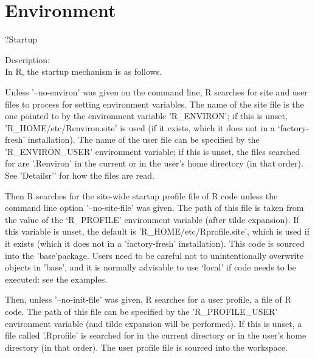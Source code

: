 \documentclass{beamer}
\begin{document}
\section{Environment}

\begin{frame}{?Startup}
\begin{tiny}
Description:\\
\bigskip
In R, the startup mechanism is as follows.\\
\bigskip

Unless '--no-environ' was given on the command line, R searches
 for site and user files to process for setting environment
 variables.  The name of the site file is the one pointed to by the
  environment variable 'R\_ENVIRON'; if this is unset,
 {\color{red} 'R\_HOME/etc/Renviron.site' is used (if it exists, which it 
 does not in a `factory-fresh' installation)}.  The name of the user file
 can be specified by the 'R\_ENVIRON\_USER' environment variable; if
 this is unset, the files searched for are {\color{blue} '.Renviron' 
 in the	current or in the user's home directory (in that order)}.  See
 'Detailsr'’ for how the files are read.\\
\bigskip

Then R searches for the site-wide startup profile file of R code
 unless the command line option '--no-site-file' was given.  The
 path of this file is taken from the value of the `R\_PROFILE'
 environment variable (after tilde expansion).  If this variable is
 unset, {\color{blue} the default is 'R\_HOME/etc/Rprofile.site', 
 which is used if it exists (which it does not in a 'factory-fresh' 
 installation)}. This code is sourced into the 'base'package.  
 Users need to be careful not to unintentionally overwrite objects 
 in 'base', and it is normally advisable to use ‘local’ if code 
 needs to be executed: see the examples.\\
\bigskip

Then, unless '--no-init-file' was given, R searches for a user
 profile, a file of R code.  The path of this file can be specified
 by the 'R\_PROFILE\_USER' environment variable (and tilde expansion
 will be performed).  If this is unset, {\color{green} a file called 
 '.Rprofile' is searched for in the current directory or in the user's
 home directory (in that order)}.  The user profile file is sourced into
 the workspace.\\
\bigskip

\end{tiny}

\end{frame}
\end{document}
